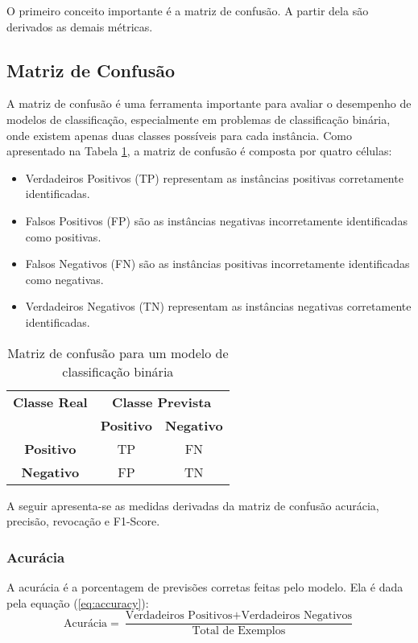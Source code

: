 O primeiro conceito importante é a matriz de confusão.  A partir dela são derivados as demais métricas.

\subsection{Matriz de Confusão}

A matriz de confusão é uma ferramenta importante para avaliar o desempenho de modelos de classificação, especialmente em problemas de classificação binária, onde existem apenas duas classes possíveis para cada instância. Como apresentado na Tabela \ref{tab:confusao}, a matriz de confusão é composta por quatro células:

\begin{itemize}
    \item Verdadeiros Positivos (TP) representam as instâncias positivas corretamente identificadas.
    \item Falsos Positivos (FP) são as instâncias negativas incorretamente identificadas como positivas.
    \item Falsos Negativos (FN) são as instâncias positivas incorretamente identificadas como negativas.
    \item Verdadeiros Negativos (TN) representam as instâncias negativas corretamente identificadas.
\end{itemize}

\begin{table}[h]
\centering
\caption{Matriz de confusão para um modelo de classificação binária}
\label{tab:confusao}
\begin{tabular}{c|cc}
\multicolumn{1}{c}{\textbf{Classe Real}} & \multicolumn{2}{c}{\textbf{Classe Prevista}} \\ \cline{2-3}
\multicolumn{1}{c|}{} & \textbf{Positivo} & \textbf{Negativo} \\ \hline
\multicolumn{1}{c|}{\textbf{Positivo}} & \cellcolor{green!25}TP & \cellcolor{red!25}FN \\
\multicolumn{1}{c|}{\textbf{Negativo}} & \cellcolor{red!25}FP & \cellcolor{green!25}TN \\ \hline
\end{tabular}
\end{table}

A seguir apresenta-se as medidas derivadas da matriz de confusão acurácia, precisão, revocação e F1-Score. 

\subsubsection{Acurácia}
A acurácia é a porcentagem de previsões corretas feitas pelo modelo. Ela é dada pela equação (\ref{eq:accuracy}):
\begin{equation}
\text{Acurácia} = \frac{\text{Verdadeiros Positivos} + \text{Verdadeiros Negativos}}{\text{Total de Exemplos}} \label{eq:accuracy}
\end{equation}

